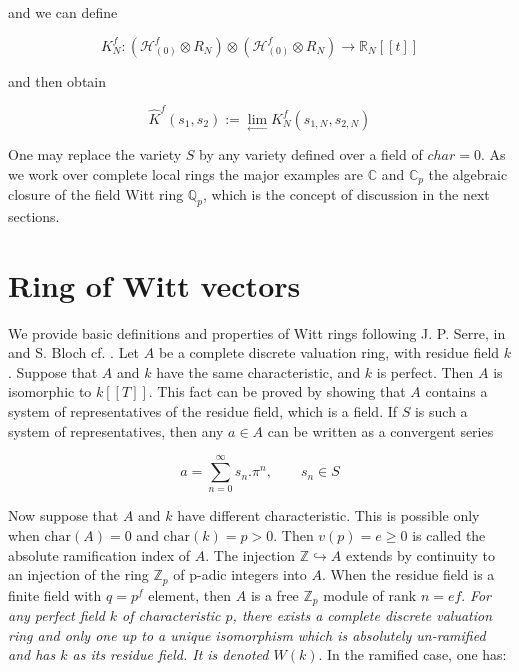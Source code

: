 \documentclass[12pt,twoside]{amsart}
\begin{document}
\noindent
and we can define 

\[ K_N^f : (\mathcal{H}_{(0)}^f \otimes R_N) \otimes (\mathcal{H}_{(0)}^f \otimes R_N) \to {{\mathbb R}}_N[[t]] \]

\vspace{0.5cm}

\noindent
and then obtain 

\[ \widehat{K}^f(s_1,s_2):=\lim_{\leftarrow}K_N^f (s_{1,N},s_{2,N})\]

\vspace{0.5cm}

\noindent
One may replace the variety $S$ by any variety defined over a field of $char=0$. As we work over complete local rings the major examples are $\mathbb{C}$ and $\mathbb{C}_p$ the algebraic closure of the field Witt ring $\mathbb{Q}_p$, which is the concept of discussion in the next sections.

\vspace{0.5cm}

\section{Ring of Witt vectors}

\vspace{0.5cm}

\noindent
We provide basic definitions and properties of Witt rings following J. P. Serre, in \cite{SE} and S. Bloch cf. \cite{BL}. Let $A$ be a complete discrete valuation ring, with residue field $k$. Suppose that $A$ and $k$ have the same characteristic, and $k$ is perfect. Then $A$ is isomorphic to $k[[T]]$. This fact can be proved by showing that $A$ contains a system of representatives of the residue field, which is a field. If $S$ is such a system of representatives, then any $a \in A$ can be written as a convergent series 

\[ a=\displaystyle{\sum_{n=0}^{\infty} s_n. \pi^n , \qquad s_n \in S} \]

\vspace{0.5cm}

\noindent
Now suppose that $A$ and $k$ have different characteristic. This is possible only when $\text{char}(A)=0$ and $\text{char}(k)=p>0$. Then $v(p)=e \geq 0$ is called the absolute ramification index of $A$. The injection $\mathbb{Z} \hookrightarrow A$ extends by continuity to an injection of the ring $\mathbb{Z}_p$ of p-adic integers into $A$. When the residue field is a finite field with $q=p^f$ element, then $A$ is a free $\mathbb{Z}_p$ module of rank $n=ef$. \textit{For any perfect field $k$ of characteristic $p$, there exists a complete discrete valuation ring and only one up to a unique isomorphism which is absolutely un-ramified and has $k$ as its residue field. It is denoted $W(k)$}. In the ramified case, one has: 
\end{document}
